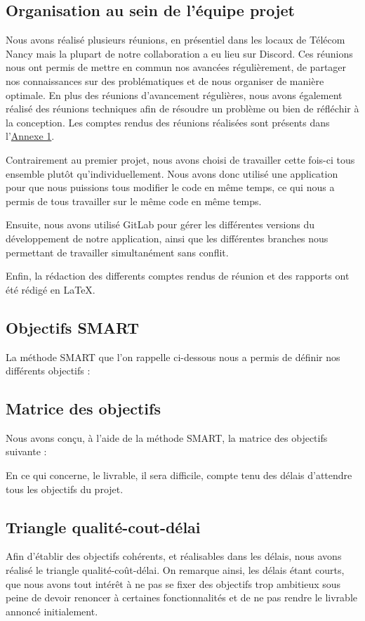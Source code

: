 \documentclass[french,a4paper]{article}
\begin{document}
    \subsection{Organisation au sein de l’équipe projet}
    Nous avons réalisé plusieurs réunions, en présentiel dans les locaux de Télécom Nancy mais la plupart de notre collaboration a eu lieu sur Discord. Ces réunions nous ont permis de mettre en commun nos avancées régulièrement, de partager nos connaissances sur des problématiques et de nous organiser de manière optimale.
    En plus des réunions d'avancement régulières, nous avons également réalisé des réunions techniques afin de résoudre un problème ou bien de réfléchir à la conception.
    Les comptes rendus des réunions réalisées sont présents dans l’\hyperlink{annexe1}{Annexe 1}.

    Contrairement au premier projet, nous avons choisi de travailler cette fois-ci tous ensemble plutôt qu'individuellement. Nous avons donc utilisé une
    application pour que nous puissions tous modifier le code en même temps, ce qui nous a permis de tous travailler sur le même code en même temps.

    Ensuite, nous avons utilisé GitLab pour gérer les différentes versions du développement de notre application, ainsi que les différentes
    branches nous permettant de travailler simultanément sans conflit.

    Enfin, la rédaction des differents comptes rendus de réunion et des rapports ont été rédigé en \LaTeX.

    \subsection{Objectifs SMART}
    La méthode SMART que l'on rappelle ci-dessous nous a permis de définir nos différents objectifs :

    \subsection{Matrice des objectifs}
    Nous avons conçu, à l'aide de la méthode SMART, la matrice des objectifs suivante :

    En ce qui concerne, le livrable, il sera difficile, compte tenu des délais d'attendre tous les objectifs du projet.
    \subsection{Triangle qualité-cout-délai}
    Afin d’établir des objectifs cohérents, et réalisables dans les délais, nous avons réalisé le triangle qualité-coût-délai. On remarque ainsi, les délais étant courts, que nous avons tout intérêt à ne pas se fixer des objectifs trop ambitieux sous peine de devoir renoncer à certaines fonctionnalités et de ne pas rendre le livrable annoncé initialement.
\end{document}
